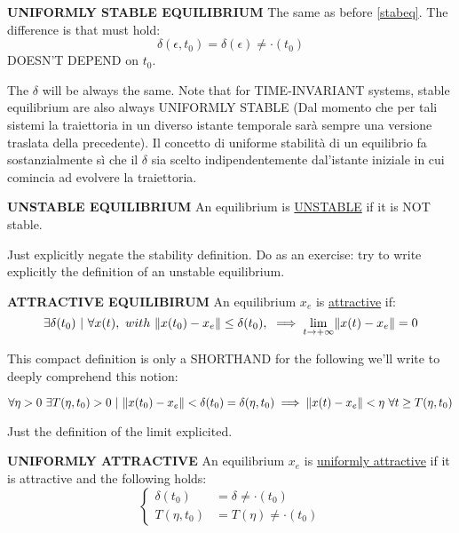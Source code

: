\begin{defn}{\textbf{UNIFORMLY STABLE EQUILIBRIUM}}
The same as before \ref{stabeq}. The difference is that must hold:
\[
	\delta(\epsilon,t_0) = \delta(\epsilon) \neq \mathord{\cdot}(t_0)
\]
DOESN'T DEPEND on $t_0$.
\end{defn}

The $\delta$ will be always the same.
Note that for TIME-INVARIANT systems, stable equilibrium are also always UNIFORMLY STABLE (Dal momento che per tali sistemi la traiettoria in un diverso istante temporale sarà sempre una versione traslata della precedente). Il concetto di uniforme stabilità di un equilibrio fa sostanzialmente sì che il $\delta$ sia scelto indipendentemente dal'istante iniziale in cui comincia ad evolvere la traiettoria.

\begin{defn}{\textbf{UNSTABLE EQUILIBRIUM}}
An equilibrium is \underline{UNSTABLE} if it is NOT stable.
\end{defn}

Just explicitly negate the stability definition. Do as an exercise: try to write explicitly the definition of an unstable equilibrium.

\begin{defn}{\textbf{ATTRACTIVE EQUILIBIRUM}}
An equilibrium $x_e$ is \underline{attractive} if:
\[
	\exists \delta(t_0)\ |\ \forall x(t),\ with\ \lVert x(t_0) - x_e\rVert \leq \delta(t_0),\ \implies \lim_{t \to +\infty} \lVert x(t) - x_e\rVert = 0
\]
\end{defn}

This compact definition is only a SHORTHAND for the following we'll write to deeply comprehend this notion:

\[	
	\forall \eta > 0\ \exists T(\eta,t_0) > 0\ |\ \lVert x(t_0) - x_e\rVert < \delta(t_0) = \delta(\eta,t_0) \implies \lVert x(t)-x_e\rVert < \eta\ \forall t \geq T(\eta,t_0)
\]

Just the definition of the limit explicited.

\begin{defn}{\textbf{UNIFORMLY ATTRACTIVE}}
An equilibrium $x_e$ is \underline{uniformly attractive} if it is attractive and the following holds:
\[
	\left\{
	\begin{aligned}
	\delta(t_0) &= \delta \neq \mathord{\cdot}(t_0) \\
	T(\eta,t_0) &= T(\eta) \neq \mathord{\cdot}(t_0)
	\end{aligned} 
	\right.
\]
\end{defn}

